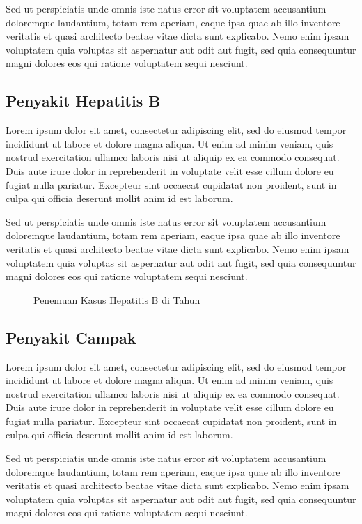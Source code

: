 Sed ut perspiciatis unde omnis iste natus error sit voluptatem accusantium doloremque laudantium, totam rem aperiam, eaque ipsa quae ab illo inventore veritatis et quasi architecto beatae vitae dicta sunt explicabo. Nemo enim ipsam voluptatem quia voluptas sit aspernatur aut odit aut fugit, sed quia consequuntur magni dolores eos qui ratione voluptatem sequi nesciunt.

\subsection{Penyakit Hepatitis B}
Lorem ipsum dolor sit amet, consectetur adipiscing elit, sed do eiusmod tempor incididunt ut labore et dolore magna aliqua. Ut enim ad minim veniam, quis nostrud exercitation ullamco laboris nisi ut aliquip ex ea commodo consequat. Duis aute irure dolor in reprehenderit in voluptate velit esse cillum dolore eu fugiat nulla pariatur. Excepteur sint occaecat cupidatat non proident, sunt in culpa qui officia deserunt mollit anim id est laborum.

Sed ut perspiciatis unde omnis iste natus error sit voluptatem accusantium doloremque laudantium, totam rem aperiam, eaque ipsa quae ab illo inventore veritatis et quasi architecto beatae vitae dicta sunt explicabo. Nemo enim ipsam voluptatem quia voluptas sit aspernatur aut odit aut fugit, sed quia consequuntur magni dolores eos qui ratione voluptatem sequi nesciunt.

\begin{figure}[H]
  \centering
  \caption{Penemuan Kasus Hepatitis B di \namaKabupaten Tahun \tP}
  \label{fig:Jumlah-HepatitisB}
\end{figure}

\subsection{Penyakit Campak}
Lorem ipsum dolor sit amet, consectetur adipiscing elit, sed do eiusmod tempor incididunt ut labore et dolore magna aliqua. Ut enim ad minim veniam, quis nostrud exercitation ullamco laboris nisi ut aliquip ex ea commodo consequat. Duis aute irure dolor in reprehenderit in voluptate velit esse cillum dolore eu fugiat nulla pariatur. Excepteur sint occaecat cupidatat non proident, sunt in culpa qui officia deserunt mollit anim id est laborum.

Sed ut perspiciatis unde omnis iste natus error sit voluptatem accusantium doloremque laudantium, totam rem aperiam, eaque ipsa quae ab illo inventore veritatis et quasi architecto beatae vitae dicta sunt explicabo. Nemo enim ipsam voluptatem quia voluptas sit aspernatur aut odit aut fugit, sed quia consequuntur magni dolores eos qui ratione voluptatem sequi nesciunt.

